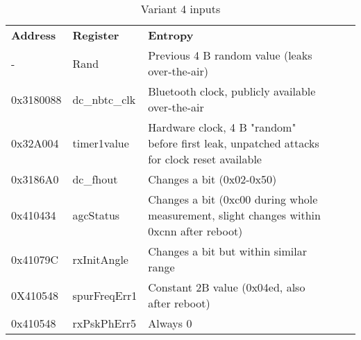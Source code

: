 \documentclass{article}
\begin{document}
\begin{table}[htb]
				\caption{Variant 4 inputs}	
	\begin{tabular}{|l|l|l|ll}
		\cline{1-3}
		\textbf{Address} & \textbf{Register} & \textbf{Entropy}                                                                               &  &  \\ \cline{1-3}
		-                & Rand              & Previous 4   B random value (leaks over-the-air)                                               &  &  \\ \cline{1-3}
		0x3180088        & dc\_nbtc\_clk     & Bluetooth  clock, publicly available over-the-air                                              &  &  \\ \cline{1-3}
		0x32A004         & timer1value       & Hardware   clock, 4 B "random" before first leak, unpatched  attacks for clock reset available &  &  \\ \cline{1-3}
		0x3186A0         & dc\_fhout         & Changes a   bit (0x02-0x50)                                                                    &  &  \\ \cline{1-3}
		0x410434         & agcStatus         & Changes a   bit (0xc00 during whole measurement, slight changes within 0xcnn after   reboot)   &  &  \\ \cline{1-3}
		0x41079C         & rxInitAngle       & Changes a   bit but within similar range                                                       &  &  \\ \cline{1-3}
		0X410548         & spurFreqErr1      & Constant   2B value (0x04ed, also after reboot)                                                &  &  \\ \cline{1-3}
		0x410548         & rxPskPhErr5       & Always 0                                                                                       &  &  \\ \cline{1-3}
	\end{tabular}
\end{table}
\end{document}
